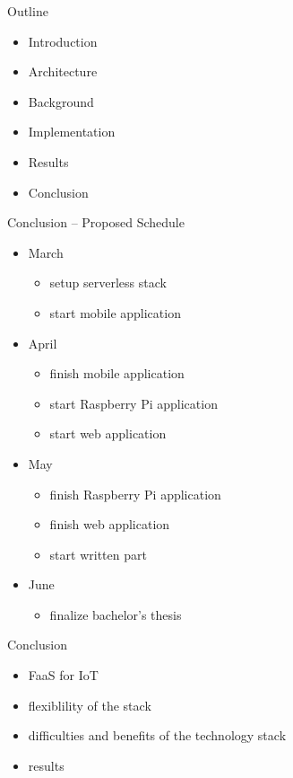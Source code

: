 \documentclass[aspectratio=169]{beamer}
\begin{document}
  \maketitle

  \begin{frame}{Outline}
    \begin{itemize}
      \item Introduction
      \item Architecture
      \item Background
      \item Implementation
      \item Results
      \item Conclusion
    \end{itemize}
  \end{frame}

  
  
  
  
  

  \begin{frame}{Conclusion -- Proposed Schedule}
    \begin{itemize}
      \item March
        \begin{itemize}
          \item setup serverless stack
          \item start mobile application
        \end{itemize}
      \item April
        \begin{itemize}
          \item finish mobile application
          \item start Raspberry Pi application
          \item start web application
        \end{itemize}
      \item May
        \begin{itemize}
          \item finish Raspberry Pi application
          \item finish web application
          \item start written part
        \end{itemize}
      \item June
        \begin{itemize}
          \item finalize bachelor’s thesis
        \end{itemize}
    \end{itemize}
  \end{frame}

  \begin{frame}{Conclusion}
    \begin{itemize}
      \item FaaS for IoT
      \item flexiblility of the stack
      \item difficulties and benefits of the technology stack
      \item results
    \end{itemize}
  \end{frame}
\end{document}
